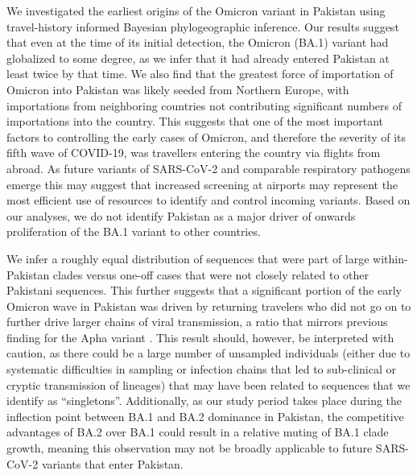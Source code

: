 We investigated the earliest origins of the Omicron variant in Pakistan using travel-history informed Bayesian phylogeographic inference.
Our results suggest that even at the time of its initial detection, the Omicron (BA.1) variant had globalized to some degree, as we infer that it had already entered Pakistan at least twice by that time.
We also find that the greatest force of importation of Omicron into Pakistan was likely seeded from Northern Europe, with importations from neighboring countries not contributing significant numbers of importations into the country.
This suggests that one of the most important factors to controlling the early cases of Omicron, and therefore the severity of its fifth wave of COVID-19, was travellers entering the country via flights from abroad.
As future variants of SARS-CoV-2 and comparable respiratory pathogens emerge this may suggest that increased screening at airports may represent the most efficient use of resources to identify and control incoming variants.
Based on our analyses, we do not identify Pakistan as a major driver of onwards proliferation of the BA.1 variant to other countries.

We infer a roughly equal distribution of sequences that were part of large within-Pakistan clades versus one-off cases that were not closely related to other Pakistani sequences.
This further suggests that a significant portion of the early Omicron wave in Pakistan was driven by returning travelers who did not go on to further drive larger chains of viral transmission, a ratio that mirrors previous finding for the Apha variant \cite{nasir2022evolutionary}.
This result should, however, be interpreted with caution, as there could be a large number of unsampled individuals (either due to systematic difficulties in sampling or infection chains that led to sub-clinical or cryptic transmission of lineages) that may have been related to sequences that we identify as ``singletons''. 
Additionally, as our study period takes place during the inflection point between BA.1 and BA.2 dominance in Pakistan, the competitive advantages of BA.2 over BA.1 could result in a relative muting of BA.1 clade growth, meaning this observation may not be broadly applicable to future SARS-CoV-2 variants that enter Pakistan.

